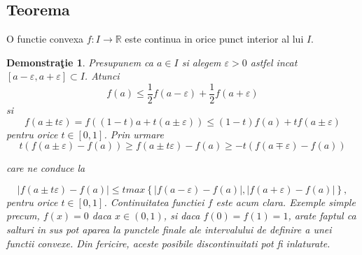 \documentclass[a4paper,12pt,oneside]{report}
\newtheorem{demonstration}{Demonstra\c tie}
\begin{document}
\subsection{Teorema}
O functie convexa \(f: I \rightarrow \mathbb{R}\) este continua in orice punct interior al lui \(I\). 	


\begin{demonstration}
	Presupunem ca \(a\in I\)
 si alegem \(\varepsilon > 0\)
 astfel incat \(\left [ a - \varepsilon , a + \varepsilon  \right ] \subset I\).
 Atunci  
\begin{displaymath}
  f\left ( a \right )\leq \frac{1}{2} f\left ( a - \varepsilon  \right ) + \frac{1}{2}f \left ( a + \varepsilon  \right )
\end{displaymath}
si 
\begin{displaymath}
  f\left ( a \pm t\varepsilon  \right )= f\left ( \left ( 1 - t \right ) a + t\left ( a \pm \varepsilon  \right )\right )\leq \left ( 1 - t \right )f\left ( a \right ) + tf\left ( a\pm \varepsilon  \right )
\end{displaymath}
pentru orice \(t\in \left [ 0 , 1 \right ]\). Prin urmare 
\begin{displaymath}
  t\left ( f\left ( a\pm \varepsilon  \right ) - f\left ( a \right ) \right )\geq f\left ( a\pm t\varepsilon  \right )- f\left ( a \right )\geq -t\left ( f\left ( a\mp \varepsilon  \right ) - f\left ( a \right )\right )
\end{displaymath}

care ne conduce la 

\begin{displaymath}
\left | f\left ( a\pm t\varepsilon  \right )- f\left ( a \right ) \right |\leq t max \left \{ \left | f\left ( a-\varepsilon  \right )- f\left ( a \right ) \right |, \left | f\left ( a+\varepsilon  \right ) - f\left ( a \right )\right | \right \},
\end{displaymath}
 pentru orice \(t\in \left [ 0 , 1 \right ]\). Continuitatea functiei \(f\) este acum clara. 
	Exemple simple precum, \(f\left ( x \right )= 0\) daca \(x\in \left ( 0 , 1 \right )\), si daca \(f\left ( 0 \right )= f\left ( 1 \right ) = 1\), arate faptul ca salturi in sus pot aparea la punctele finale ale intervalului de definire a unei functii convexe. Din fericire, aceste posibile discontinuitati pot fi inlaturate. 

\end{demonstration}
\end{document}
